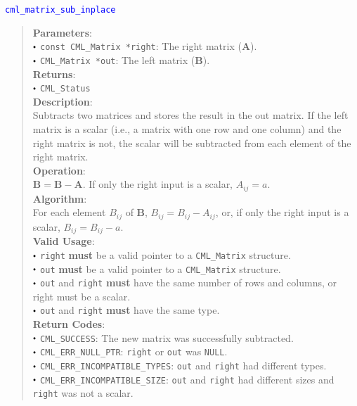 \documentclass[a4paper,oneside,8pt]{extarticle}
\newcommand{\function}[1]{
  \noindent\textcolor{blue}{\texttt{#1}}
  \vspace{-0.3em}
}
\renewcommand{\dot}{\raisebox{0.3ex}{\scalebox{0.6}{$\bullet$}}}
\theoremstyle{definition}
\begin{document}
\function{cml\_matrix\_sub\_inplace}
\begin{quote}
  \textbf{Parameters}: \\
  $\dot$ \texttt{const CML\_Matrix *right}: The right matrix ($\mathbf{A}$). \\
  $\dot$ \texttt{CML\_Matrix *out}: The left matrix ($\mathbf{B}$). \\
  \textbf{Returns}: \\
  $\dot$ \texttt{CML\_Status} \\

  \vspace{-0.75em}
  \textbf{Description}: \\
  Subtracts two matrices and stores the result in the out matrix. If the left matrix is a scalar (i.e., a matrix with one row and one column) and the right matrix is not, the scalar will be subtracted from each element of the right matrix. \\

  \vspace{-0.75em}
  \textbf{Operation}: \\
  $\mathbf{B} = \mathbf{B} - \mathbf{A}$. If only the right input is a scalar, $A_{ij} = a$. \\

  \vspace{-0.75em}
  \textbf{Algorithm}: \\
  For each element $B_{ij}$ of $\mathbf{B}$, $B_{ij} = B_{ij} - A_{ij}$, or, if only the right input is a scalar, $B_{ij} = B_{ij} - a$. \\

  \vspace{-0.75em}
  \textbf{Valid Usage}: \\
  $\dot$ \texttt{right} \textbf{must} be a valid pointer to a \texttt{CML\_Matrix} structure. \\
  $\dot$ \texttt{out} \textbf{must} be a valid pointer to a \texttt{CML\_Matrix} structure. \\
  $\dot$ \texttt{out} and \texttt{right} \textbf{must} have the same number of rows and columns, or right must be a scalar. \\
  $\dot$ \texttt{out} and \texttt{right} \textbf{must} have the same type. \\

  \vspace{-0.75em}
  \textbf{Return Codes}: \\
  $\dot$ \texttt{CML\_SUCCESS}: The new matrix was successfully subtracted. \\
  $\dot$ \texttt{CML\_ERR\_NULL\_PTR}: \texttt{right} or \texttt{out} was \texttt{NULL}. \\
  $\dot$ \texttt{CML\_ERR\_INCOMPATIBLE\_TYPES}: \texttt{out} and \texttt{right} had different types. \\
  $\dot$ \texttt{CML\_ERR\_INCOMPATIBLE\_SIZE}: \texttt{out} and \texttt{right} had different sizes and \texttt{right} was not a scalar. \\
\end{quote}
\end{document}
